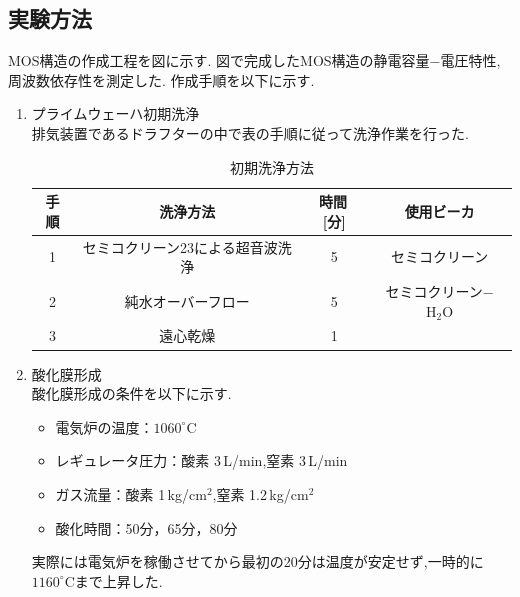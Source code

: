 \documentclass[11pt]{jarticle}
\begin{document}
	\subsection{実験方法}
		MOS構造の作成工程を図に示す.
		図で完成したMOS構造の静電容量−電圧特性,周波数依存性を測定した.
		作成手順を以下に示す.
		\begin{enumerate}
			\item プライムウェーハ初期洗浄\\
				排気装置であるドラフターの中で表の手順に従って洗浄作業を行った.
				\begin{table}[H]
				\begin{center}
				\caption{初期洗浄方法}
				\label{tab:wash}
				\begin{tabular}{c|ccc} \toprule
					手順&洗浄方法&時間\,[分]&使用ビーカ\\ \hline
					1&セミコクリーン23による超音波洗浄&5&セミコクリーン\\
					2&純水オーバーフロー&5&セミコクリーン−$\mathrm{H_{2}O}$\\
					3&遠心乾燥&1&\\ \bottomrule
				\end{tabular}
				\end{center}
				\end{table}

			\item 酸化膜形成\\
				酸化膜形成の条件を以下に示す.
				\begin{itemize}
					\item 電気炉の温度：$1060^\circ \mathrm{C}$
					\item レギュレータ圧力：酸素 3\,L/min,窒素 3\,L/min
					\item ガス流量：酸素 1\,kg/$\mathrm{cm^{2}}$,窒素 1.2\,kg/$\mathrm{cm^{2}}$
					\item 酸化時間：50分，65分，80分
				\end{itemize}
				実際には電気炉を稼働させてから最初の20分は温度が安定せず,一時的に$1160^\circ \mathrm{C}$まで上昇した.


\end{enumerate}
\end{document}

